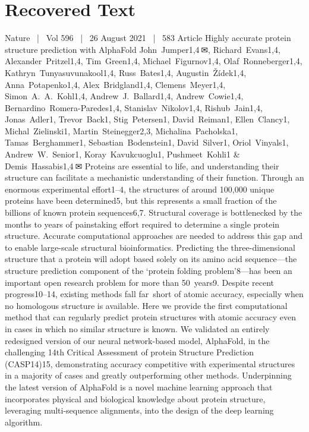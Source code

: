 \section{Recovered Text}
Nature  |  Vol 596  |  26 August 2021  |  583
Article
Highly accurate protein structure prediction
with AlphaFold
John Jumper1,4 ✉, Richard Evans1,4, Alexander Pritzel1,4, Tim Green1,4, Michael Figurnov1,4,
Olaf Ronneberger1,4, Kathryn Tunyasuvunakool1,4, Russ Bates1,4, Augustin Žídek1,4,
Anna Potapenko1,4, Alex Bridgland1,4, Clemens Meyer1,4, Simon A. A. Kohl1,4,
Andrew J. Ballard1,4, Andrew Cowie1,4, Bernardino Romera-Paredes1,4, Stanislav Nikolov1,4,
Rishub Jain1,4, Jonas Adler1, Trevor Back1, Stig Petersen1, David Reiman1, Ellen Clancy1,
Michal Zielinski1, Martin Steinegger2,3, Michalina Pacholska1, Tamas Berghammer1,
Sebastian Bodenstein1, David Silver1, Oriol Vinyals1, Andrew W. Senior1, Koray Kavukcuoglu1,
Pushmeet Kohli1 \& Demis Hassabis1,4 ✉
Proteins are essential to life, and understanding their structure can facilitate a
mechanistic understanding of their function. Through an enormous experimental
effort1–4, the structures of around 100,000 unique proteins have been determined5, but
this represents a small fraction of the billions of known protein sequences6,7. Structural
coverage is bottlenecked by the months to years of painstaking effort required to
determine a single protein structure. Accurate computational approaches are needed
to address this gap and to enable large-scale structural bioinformatics. Predicting the
three-dimensional structure that a protein will adopt based solely on its amino acid
sequence—the structure prediction component of the ‘protein folding problem’8—has
been an important open research problem for more than 50 years9. Despite recent
progress10–14, existing methods fall far short of atomic accuracy, especially when no
homologous structure is available. Here we provide the first computational method
that can regularly predict protein structures with atomic accuracy even in cases in which
no similar structure is known. We validated an entirely redesigned version of our neural
network-based model, AlphaFold, in the challenging 14th Critical Assessment of protein
Structure Prediction (CASP14)15, demonstrating accuracy competitive with
experimental structures in a majority of cases and greatly outperforming other
methods. Underpinning the latest version of AlphaFold is a novel machine learning
approach that incorporates physical and biological knowledge about protein structure,
leveraging multi-sequence alignments, into the design of the deep learning algorithm.
